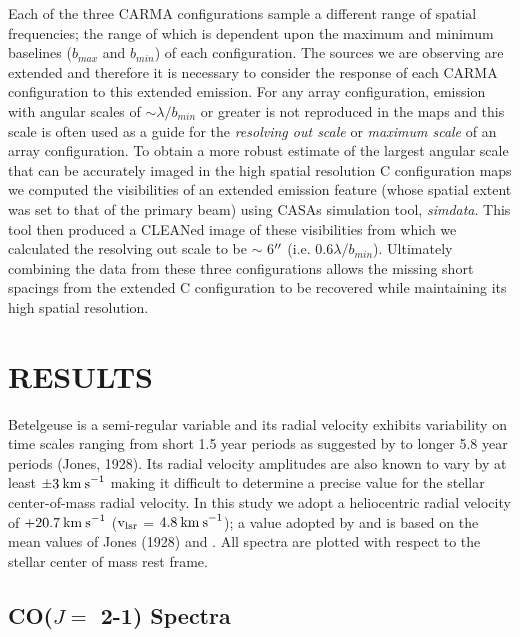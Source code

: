 \documentclass[iop]{emulateapj}
\begin{document}
Each of the three CARMA configurations sample a different range of spatial frequencies; the range of which is dependent upon the maximum and minimum baselines ($b_{max}$ and $b_{min}$) of each configuration. The sources we are observing are extended and therefore it is necessary to consider the response of each CARMA configuration to this extended emission. For any array configuration, emission with angular scales of $\sim \lambda/b_{min}$ or greater is not reproduced in the maps \citep{1999ASPC..180.....T} and this scale is often used as a guide for the \textit{resolving out scale} or \textit{maximum scale} of an array configuration. To obtain a more robust estimate of the largest angular scale that can be accurately imaged in the high spatial resolution C configuration maps we computed the visibilities of an extended emission feature (whose spatial extent was set to that of the primary beam) using CASAs simulation tool, \textit{simdata}. This tool then produced a CLEANed image of these visibilities from which we calculated the resolving out scale to be $\sim$ 6$\mbox{$^{\prime\prime}$}$ 
(i.e. $0.6\lambda/b_{min}$). Ultimately combining the data from these three configurations allows the missing short spacings from the extended C configuration to be recovered while maintaining its high spatial resolution.

\section{RESULTS} 

Betelgeuse is a  semi-regular variable and its radial velocity exhibits variability on time scales ranging from short 1.5 year periods as suggested by \cite{1931PWasO..15..178S} to longer 5.8 year periods (Jones, 1928). Its radial velocity amplitudes are also known to vary by at least $\pm 3\>{\rm km\>s}^{-1}$ \citep{1989AJ.....98.2233S} making it difficult to determine a precise value for the stellar center-of-mass radial velocity. In this study we adopt a heliocentric radial velocity of $+20.7\>{\rm km\>s}^{-1}$ ($\rm{v_{lsr}}$ = $4.8\>{\rm km\>s}^{-1}$); a value adopted by \citet{2008AJ....135.1430H} and is based on the mean values of Jones (1928) and \cite{1933CMWCI.464....1S}. All spectra are plotted with respect to the stellar center of mass rest frame.

\subsection{CO($J=$ 2-1) Spectra} \label{results1} %
\end{document}
